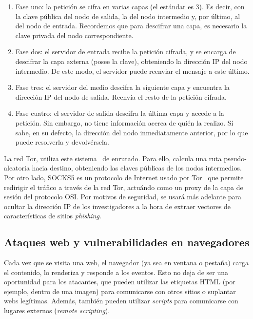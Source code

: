 \begin{enumerate}
	\item Fase uno: la petición se cifra en varias capas (el estándar es 3). Es decir, con la clave pública del nodo de salida, la del nodo intermedio y, por último, al del nodo de entrada. Recordemos que para descifrar una capa, es necesario la clave privada del nodo correspondiente.
	\item Fase dos: el servidor de entrada recibe la petición cifrada, y se encarga de descifrar la capa externa (posee la clave), obteniendo la dirección IP del nodo intermedio. De este modo, el servidor puede reenviar el mensaje a este último.
	\item Fase tres: el servidor del medio descifra la siguiente capa y encuentra la dirección IP del nodo de salida. Reenvía el resto de la petición cifrada.
	\item Fase cuatro: el servidor de salida descifra la última capa y accede a la petición. Sin embargo, no tiene información acerca de quién la realizo. Sí sabe, en su defecto, la dirección del nodo inmediatamente anterior, por lo que puede resolverla y devolvérsela.
\end{enumerate}

La red Tor, utiliza este sistema~\cite{TorAndrea2022} de enrutado. Para ello, calcula una ruta pseudo-aleatoria hacia destino, obteniendo las claves públicas de los nodos intermedios. Por otro lado, SOCKS5 es un protocolo de Internet usado por Tor~\cite{SOCKS5Tor2022} que permite redirigir el tráfico a través de la red Tor, actuándo como un proxy de la capa de sesión del protocolo OSI. Por motivos de seguridad, se usará más adelante para ocultar la dirección IP de los investigadores a la hora de extraer vectores de características de sitios \textit{phishing}.

\subsection{Ataques web y vulnerabilidades en navegadores}

Cada vez que se visita una web, el navegador (ya sea en ventana o pestaña) carga el contenido, lo renderiza y responde a los eventos. Esto no deja de ser una oportunidad para los atacantes, que pueden utilizar las etiquetas HTML (por ejemplo, dentro de una imagen) para comunicarse con otros sitios o suplantar webs legítimas. Además, también pueden utilizar \textit{scripts} para comunicarse con lugares externos (\textit{remote scripting}).

